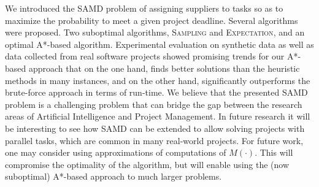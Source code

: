 \documentclass[letterpaper]{article}
\newcommand{\samd}{\ac{SAMD}\xspace}
\newcommand{\astar}{\textsc{A*}\xspace}
\newcommand{\sampling}{\textsc{Sampling}\xspace}
\newcommand{\expectation}{\textsc{Expectation}\xspace}
\begin{document}
We introduced the \samd problem of assigning suppliers to tasks so as to maximize the probability to meet a given project deadline. Several algorithms were proposed. Two suboptimal algorithms, \sampling and \expectation, and an optimal \astar-based algorithm. %
Experimental evaluation on synthetic data as well as data collected from real software projects showed promising trends for our \astar-based approach that on the one hand, finds better solutions than the heuristic methods in many instances, and on the other hand, significantly outperforms the brute-force approach in terms of run-time.
We believe that the presented \samd problem is a challenging problem that can bridge the gap between the research areas of Artificial Intelligence and Project Management. In future research it will be interesting to see how \samd can be extended to allow solving projects with parallel tasks, which are common in many real-world projects.
For future work, one may consider using approximations of computations of $M(\cdot)$.
This will compromise the optimality of the algorithm, but will enable using the (now suboptimal) \astar-based approach to much larger problems.
\end{document}
